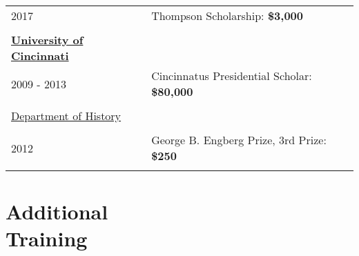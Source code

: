 \documentclass[margin,line,pifont,palatino,courier]{res}
\newenvironment{list1}{
  \begin{list}{\ding{113}}{%
      \setlength{\itemsep}{0in}
      \setlength{\parsep}{0in} \setlength{\parskip}{0in}
      \setlength{\topsep}{0in} \setlength{\partopsep}{0in}
      \setlength{\leftmargin}{0.17in}}}{\end{list}}
\begin{document}
\begin{resume}
\begin{tabular}{ll}
  2017       & Thompson Scholarship: \bf{\$3,000}\\
  \\
  \textbf{\underline{University of Cincinnati}}&\\
  2009 - 2013 & Cincinnatus Presidential Scholar: \bf{\$80,000}\\
  \\
  \underline{Department of History}&\\
  \\
  2012       & George B. Engberg Prize, 3rd Prize: \bf{\$250}  \\
  \\
\end{tabular}





\section{\sc Additional\\ Training}


\end{resume}
\end{document}
